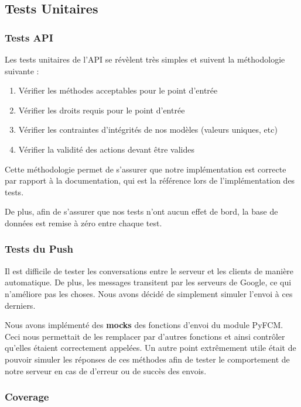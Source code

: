 \documentclass[french]{article}
\begin{document}
	\subsection{Tests Unitaires}
	\subsubsection{Tests API}
	
	Les tests unitaires de l'API se révèlent très simples et suivent la méthodologie suivante :
	
	\begin{enumerate}
		\item Vérifier les méthodes acceptables pour le point d'entrée
		\item Vérifier les droits requis pour le point d'entrée
		\item Vérifier les contraintes d'intégrités de nos modèles (valeurs uniques, etc)
		\item Vérifier la validité des actions devant être valides
	\end{enumerate}

	Cette méthodologie permet de s'assurer que notre implémentation est correcte par rapport à la documentation, qui est la référence lors de l'implémentation des tests.
	
	De plus, afin de s'assurer que nos tests n'ont aucun effet de bord, la base de données est remise à zéro entre chaque test.
	
	\subsubsection{Tests du Push}
	
	Il est difficile de tester les conversations entre le serveur et les clients de manière automatique. De plus, les messages transitent par les serveurs de Google, ce qui n'améliore pas les choses. Nous avons décidé de simplement simuler l'envoi à ces derniers.
	
	Nous avons implémenté des \textbf{mocks} des fonctions d'envoi du module PyFCM. Ceci nous permettait de les remplacer par d'autres fonctions et ainsi contrôler qu'elles étaient correctement appelées.
    Un autre point extrêmement utile était de pouvoir simuler les réponses de ces méthodes afin de tester le comportement de notre serveur en cas de d'erreur ou de succès des envois.
	
	\subsubsection{Coverage}
	
\end{document}
